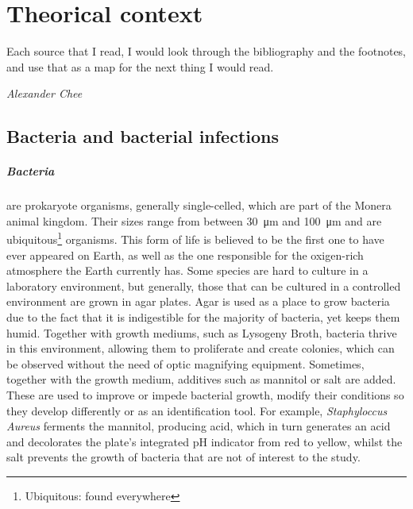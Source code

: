 \chapter{Theorical context}
\epigraph{Each source that I read, I would look through the bibliography and the footnotes, and use that as a map for the next thing I would read.}{\textit{Alexander Chee}}
\section{Bacteria and bacterial infections}
\paragraph{Bacteria} are prokaryote organisms, generally single-celled, which are part of the Monera animal kingdom. Their sizes range from between \SI{30}{\micro\metre} and \SI{100}{\micro\metre} and are ubiquitous\footnote{Ubiquitous: found everywhere} organisms. This form of life is believed to be the first one to have ever appeared on Earth, as well as the one responsible for the oxigen-rich atmosphere the Earth currently has. Some species are hard to culture in a laboratory environment, but generally, those that can be cultured in a controlled environment are grown in agar plates\cite{murrayMicrobiologiaMedica2013}. \newline
Agar is used as a place to grow bacteria due to the fact that it is indigestible for the majority of bacteria, yet keeps them humid. Together with growth mediums, such as Lysogeny Broth, bacteria thrive in this environment, allowing them to proliferate and create colonies, which can be observed without the need of optic magnifying equipment. Sometimes, together with the growth medium, additives such as mannitol or salt are added. These are used to improve or impede bacterial growth, modify their conditions so they develop differently or as an identification tool. For example, \emph{Staphyloccus Aureus} ferments the mannitol, producing acid, which in turn generates an acid and decolorates the plate's integrated pH indicator from red to yellow, whilst the salt prevents the growth of bacteria that are not of interest to the study\cite{gamazoManualPracticoMicrobiologia2010}.
